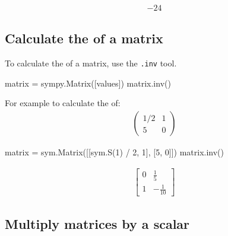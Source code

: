 \begin{equation*}
\begin{split}\displaystyle -24\end{split}
\end{equation*}




\subsection{Calculate the  of a matrix}
\label{\detokenize{tools-for-mathematics/04-matrices/how/main:calculate-the-inverse-of-a-matrix}}

To calculate the  of a matrix, use the \texttt{.inv} tool.


\begin{api}
matrix = sympy.Matrix([values])
matrix.inv()
\end{api}



For example to
calculate the  of:
\begin{equation*}
\begin{split}
    \begin{pmatrix}
        1 / 2 & 1\\
        5     & 0
    \end{pmatrix}
\end{split}
\end{equation*}



\begin{pyin}
matrix = sym.Matrix([[sym.S(1) / 2, 1], [5, 0]])
matrix.inv()
\end{pyin}




\begin{equation*}
\begin{split}\displaystyle \left[\begin{matrix}0 & \frac{1}{5}\\1 & - \frac{1}{10}\end{matrix}\right]\end{split}
\end{equation*}




\subsection{Multiply matrices by a scalar}
\label{\detokenize{tools-for-mathematics/04-matrices/how/main:multiply-matrices-by-a-scalar}}

